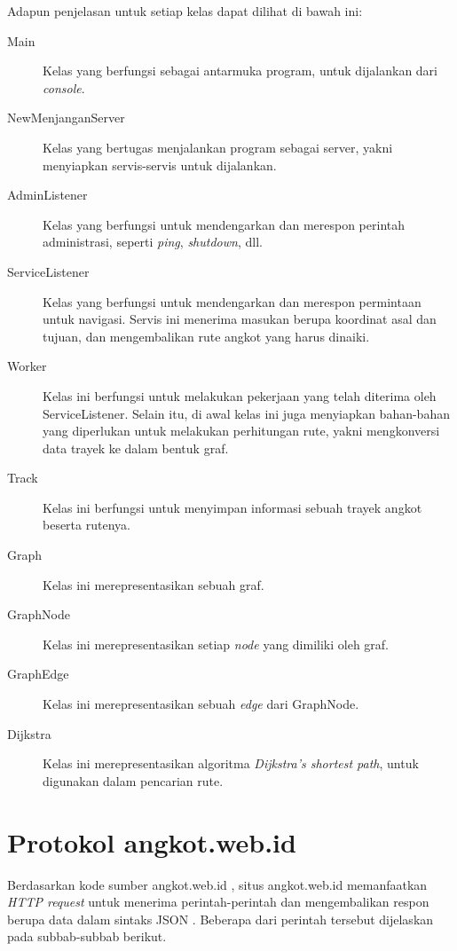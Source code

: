 Adapun penjelasan untuk setiap kelas dapat dilihat di bawah ini:

\begin{description}
	\item[Main] Kelas yang berfungsi sebagai antarmuka program, untuk dijalankan dari \textit{console}.
	\item[NewMenjanganServer] Kelas yang bertugas menjalankan program sebagai server, yakni menyiapkan servis-servis untuk dijalankan.
	\item[AdminListener] Kelas yang berfungsi untuk mendengarkan dan merespon perintah administrasi, seperti \textit{ping}, \textit{shutdown}, dll.
	\item[ServiceListener] Kelas yang berfungsi untuk mendengarkan dan merespon permintaan untuk navigasi. Servis ini menerima masukan berupa koordinat asal dan tujuan, dan mengembalikan rute angkot yang harus dinaiki.
	\item[Worker] Kelas ini berfungsi untuk melakukan pekerjaan yang telah diterima oleh ServiceListener. Selain itu, di awal kelas ini juga menyiapkan bahan-bahan yang diperlukan untuk melakukan perhitungan rute, yakni mengkonversi data trayek ke dalam bentuk graf.
	\item[Track] Kelas ini berfungsi untuk menyimpan informasi sebuah trayek angkot beserta rutenya.
	\item[Graph] Kelas ini merepresentasikan sebuah graf.
	\item[GraphNode] Kelas ini merepresentasikan setiap \textit{node} yang dimiliki oleh graf.
	\item[GraphEdge] Kelas ini merepresentasikan sebuah \textit{edge} dari GraphNode.
	\item[Dijkstra] Kelas ini merepresentasikan algoritma \textit{Dijkstra's shortest path}\cite{Cormen:2001}, untuk digunakan dalam pencarian rute.
\end{description}

\section{Protokol angkot.web.id}
\label{sec:protokol_angkot_web_id}

Berdasarkan kode sumber angkot.web.id \cite{angkotwebid}, situs angkot.web.id memanfaatkan \textit{HTTP request} \cite{rfc7231} untuk menerima perintah-perintah dan mengembalikan respon berupa data dalam sintaks JSON \cite{rfc7159}. Beberapa dari perintah tersebut dijelaskan pada subbab-subbab berikut.

